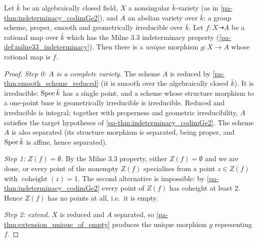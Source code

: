 \begin{theorem}
  \label{pa-thm:extend_to_av}
  \leanok

  Let \(\bar k\) be an algebraically closed field, \(X\) a nonsingular
  \(\bar k\)-variety (as in \ref{pa-thm:indeterminacy_codimGe2}), and \(A\) an
  abelian variety over \(\bar k\): a group scheme, proper, smooth and
  geometrically irreducible over \(\bar k\). Let \(f : X \dashrightarrow A\)
  be a rational map over \(\bar k\) which has the Milne 3.3 indeterminacy
  property (\ref{pa-def:milne33_indeterminacy}). Then there is a \emph{unique}
  morphism \(g : X \to A\) whose rational map is \(f\).
\end{theorem}
\begin{proof}
  \leanok
  \emph{Step 0: \(A\) is a complete variety.} The scheme \(A\) is reduced by
  \ref{pa-thm:smooth_scheme_reduced} (it is smooth over the algebraically closed
  \(\bar k\)). It is irreducible: \(\operatorname{Spec} \bar k\) has a single point, and a
  scheme whose structure morphism to a one-point base is geometrically
  irreducible is irreducible. Reduced and irreducible is integral; together
  with properness and geometric irreducibility, \(A\) satisfies the target
  hypotheses of \ref{pa-thm:indeterminacy_codimGe2}. The scheme \(A\) is also
  separated (its structure morphism is separated, being proper, and
  \(\operatorname{Spec} \bar k\) is affine, hence separated).

  \emph{Step 1: \(Z(f) = \emptyset\).} By the Milne 3.3 property, either
  \(Z(f) = \emptyset\) and we are done, or every point of the nonempty
  \(Z(f)\) specialises from a point \(z \in Z(f)\) with
  \(\operatorname{coheight}(z) = 1\). The second alternative is impossible:
  by \ref{pa-thm:indeterminacy_codimGe2} every point of \(Z(f)\) has coheight at
  least \(2\). Hence \(Z(f)\) has no points at all, i.e.\ it is empty.

  \emph{Step 2: extend.} \(X\) is reduced and \(A\) separated, so
  \ref{pa-thm:extension_unique_of_empty} produces the unique morphism \(g\)
  representing \(f\).
\end{proof}

